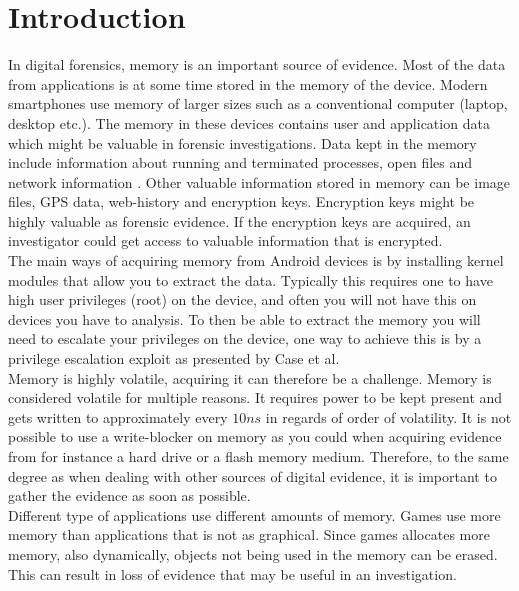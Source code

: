 \section{Introduction}

In digital forensics, memory is an important source of evidence. Most of the data from applications is at some time 
stored in the memory of the device. Modern smartphones use memory of larger sizes such as a conventional computer (laptop, 
desktop etc.). The memory in these devices contains user and application data which might be valuable in forensic 
investigations. Data kept in the memory include information about running and terminated processes, open files and 
network information \cite{acq_vol_android_mem}. Other valuable information stored in memory can be image files, GPS data, 
web-history and encryption keys. Encryption keys might be highly valuable as forensic evidence. If the encryption keys 
are acquired, an investigator could get access to valuable information that is encrypted. \\

The main ways of acquiring memory from Android devices is by installing kernel 
modules that allow you to extract the data. Typically this requires one to
have high user privileges (root) on the device, and often you will not have 
this on devices you have to analysis. To then be able to extract the memory you 
will need to escalate your privileges on the device, one way to achieve this is by
a privilege escalation exploit as presented by Case et al\cite{acq_vol_android_mem}.\\


Memory is highly volatile, acquiring it can therefore be a challenge. Memory is 
considered volatile for multiple reasons. It requires  power to be kept present
\cite{the_art_of_mem} and gets written to approximately every $10ns$ in regards
of order of volatility. %
It is not possible to use a write-blocker on memory as you could when acquiring 
evidence from for instance a hard drive or a flash memory medium. Therefore, to 
the same degree as when dealing with other sources of digital evidence, it is 
important to gather the evidence as soon as possible. \\

Different type of applications use different amounts of memory. Games use more 
memory than applications that is not as graphical. Since games allocates more 
memory, also dynamically, objects not being used in the memory can be erased. 
This can result in loss of evidence that may be useful in an investigation.\\


